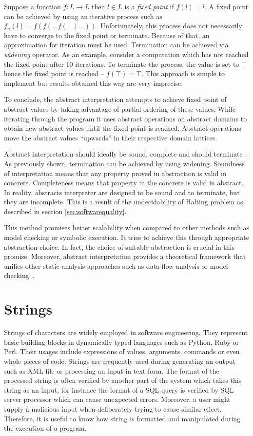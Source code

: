 \documentclass[12pt,final,oneside]{fithesis2}
\theoremstyle{definition}
\begin{document}
Suppose a function $f: L \to L$ then $l \in L$ is a \textit{fixed point}
if $f(l) = l$. A fixed point can be achieved by using an iterative process
such as $f_n(l) = f(f( \dots f(\bot) \dots ))$. Unfortunately, this process
does not necessarily have to converge to the fixed point or terminate.
Because of that, an approximation for iteration must be used. Termination
can be achieved via \textit{widening} operator. As an example, consider a
computation which has not reached the fixed point after 10 iterations.
To terminate the process, the value is set to $\top$ hence the fixed point
is reached -- $f(\top) = \top$. This approach is simple to implement but
results obtained this way are very imprecise.

To conclude, the abstract interpretation attempts to achieve fixed point of
abstract values by taking advantage of partial ordering of these values.
While iterating through the program it uses abstract operations on abstract
domains to obtain new abstract values until the fixed point is reached.
Abstract operations move the abstract values ``upwards'' in their respective
domain lattices.

Abstract interpretation should ideally be sound, complete and should
terminate \cite{aiaa10}. As previously shown, termination can be achieved by
using widening. Soundness of interpretation means that any property proved
in abstraction is valid in concrete. Completeness means that property in
the concrete is valid in abstract. In reality, abstracts interpreter are
designed to be sound and to terminate, but they are incomplete. This is
a result of the undecidability of Halting problem as described in
section \ref{sec:softwarequality}.

This method promises better scalability when compared to other
methods such as model checking or symbolic execution. It tries to achieve
this through appropriate abstraction choice. In fact, the choice of suitable
abstraction is crucial in this promise. Moreover, abstract interpretation
provides a theoretical framework that unifies other static analysis
approaches such as data-flow analysis \cite{CousotCousot77-1} or model
checking~\cite{CousotCousot99-1}.


\section{Strings}
\label{sec:strings}

Strings of characters are widely employed in software engineering. They
represent basic building blocks in dynamically typed languages such as
Python, Ruby or Perl. Their usages include expressions of values,
arguments, commands or even whole pieces of code. Strings are frequently
used during generating an output such as XML file or processing an input
in text form. The format of the processed string is often verified by
another part of the system which takes this string as an input, for
instance the format of a SQL query is verified by SQL server processor
which can cause unexpected errors. Moreover, a user might supply a
malicious input when deliberately trying to cause similar effect.
Therefore, it is useful to know how string is formatted and manipulated
during the execution of a program.
\end{document}
